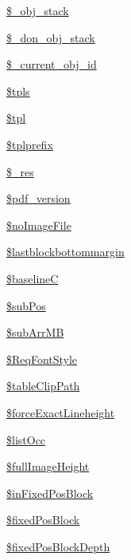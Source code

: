\begin{DoxyCompactItemize}
\item 
\hyperlink{classm_p_d_f_a3aa98dab40c65c74583f27f3acf57a3f}{\$\-\_\-obj\-\_\-stack}
\item 
\hyperlink{classm_p_d_f_aa918016b47953546b4eb7d2209ccec64}{\$\-\_\-don\-\_\-obj\-\_\-stack}
\item 
\hyperlink{classm_p_d_f_ab14037be02ea6e4d61a5b4f3a7500bfd}{\$\-\_\-current\-\_\-obj\-\_\-id}
\item 
\hyperlink{classm_p_d_f_a938a86742fcae3962842336246ae13ee}{\$tpls}
\item 
\hyperlink{classm_p_d_f_ad6a15644f2611ac002318c134da79c2a}{\$tpl}
\item 
\hyperlink{classm_p_d_f_a2f30fa20bd7cc74a25f4d65e374e6293}{\$tplprefix}
\item 
\hyperlink{classm_p_d_f_a2c56a9e45f9c2f2d9ba0185813a0e6d4}{\$\-\_\-res}
\item 
\hyperlink{classm_p_d_f_a315188774fa5539ebb7cc08c650de5df}{\$pdf\-\_\-version}
\item 
\hyperlink{classm_p_d_f_a713a22e64bd5994aef2e9624bfcf5ffd}{\$no\-Image\-File}
\item 
\hyperlink{classm_p_d_f_a65fbc82c6cdf8794e1e55f4295e29577}{\$lastblockbottommargin}
\item 
\hyperlink{classm_p_d_f_a12df8de980644c15035ed39e3a30dd90}{\$baseline\-C}
\item 
\hyperlink{classm_p_d_f_a6503b48d73846b559ef730caa3fdca5b}{\$sub\-Pos}
\item 
\hyperlink{classm_p_d_f_a298578ab7f8bbce10913f4a4bf4b239d}{\$sub\-Arr\-M\-B}
\item 
\hyperlink{classm_p_d_f_a3da2acf01a1958a2158bace9282a834b}{\$\-Req\-Font\-Style}
\item 
\hyperlink{classm_p_d_f_a6a054bfe61fb71a868b9b5df4e57a6fc}{\$table\-Clip\-Path}
\item 
\hyperlink{classm_p_d_f_a47e05dab97877ceca1db912067cc602d}{\$force\-Exact\-Lineheight}
\item 
\hyperlink{classm_p_d_f_af16d05b1def90fc1b911122eef85f36d}{\$list\-Occ}
\item 
\hyperlink{classm_p_d_f_a1fe2deb0cd7e09e31e3c04772109781f}{\$full\-Image\-Height}
\item 
\hyperlink{classm_p_d_f_a630952d096c2f17e2e81cf2b1e5510ee}{\$in\-Fixed\-Pos\-Block}
\item 
\hyperlink{classm_p_d_f_a7fd2be45cd0791b525d6254c85c51aa5}{\$fixed\-Pos\-Block}
\item 
\hyperlink{classm_p_d_f_a438411d6c0f2e36cbda5930590274f64}{\$fixed\-Pos\-Block\-Depth}

\end{DoxyCompactItemize}
